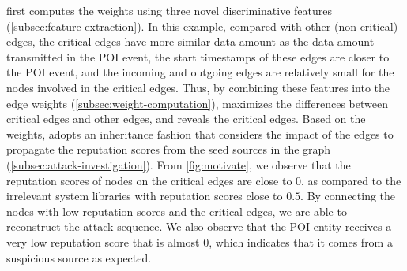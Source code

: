 \tool first computes the weights using three novel discriminative features (\cref{subsec:feature-extraction}).
In this example, compared with other (\ie non-critical) edges, the critical edges have more similar data amount as the data amount transmitted in the POI event, the start timestamps of these edges are closer to the POI event, and the incoming and outgoing edges are relatively small for the nodes involved in the critical edges.
Thus, by combining these features into the edge weights (\cref{subsec:weight-computation}), \tool maximizes the differences between critical edges and other edges, and reveals the critical edges.
Based on the weights, \tool adopts an inheritance fashion that considers the impact of the edges to propagate the reputation scores from the seed sources in the graph (\cref{subsec:attack-investigation}).
%
From \cref{fig:motivate}, we observe that the reputation scores of nodes on the critical edges are close to $0$, as compared to the irrelevant system libraries with reputation scores close to $0.5$.
By connecting the nodes with low reputation scores and the critical edges, we are able to reconstruct the attack sequence.
We also observe that the POI entity receives a very low reputation score that is almost $0$, which indicates that it comes from a suspicious source as expected.

      



